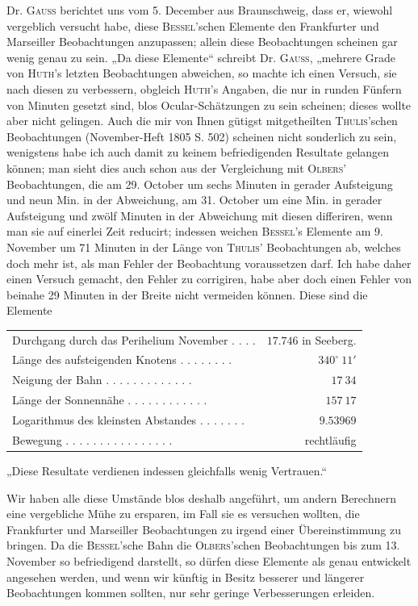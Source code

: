 Dr. \textsc{Gauss} berichtet uns vom 5. December aus Braunschweig, dass er, wiewohl vergeblich versucht habe, diese \textsc{Bessel}'schen Elemente den Frankfurter und Marseiller Beobachtungen anzupassen; allein diese Beobachtungen scheinen gar wenig genau zu sein. „Da diese Elemente“ schreibt Dr. \textsc{Gauss}, „mehrere Grade von \textsc{Huth}'s letzten Beobachtungen abweichen, so machte ich einen Versuch, sie nach diesen zu verbessern, obgleich \textsc{Huth}'s Angaben, die nur in runden Fünfern von Minuten gesetzt sind, blos Ocular-Schätzungen zu sein scheinen; dieses wollte aber nicht gelingen. Auch die mir von Ihnen gütigst mitgetheilten \textsc{Thulis}'schen Beobachtungen (November-Heft 1805 S. 502) scheinen nicht sonderlich zu sein, wenigstens habe ich auch damit zu keinem befriedigenden Resultate gelangen können; man sieht dies auch schon aus der Vergleichung mit \textsc{Olbers}' Beobachtungen, die am 29. October um sechs Minuten in gerader Aufsteigung und neun Min. in der Abweichung, am 31. October um eine Min. in gerader Aufsteigung und zwölf Minuten in der Abweichung mit diesen differiren, wenn man sie auf einerlei Zeit reducirt; indessen weichen \textsc{Bessel}'s Elemente am 9. November um 71 Minuten in der Länge von \textsc{Thulis}' Beobachtungen ab, welches doch mehr ist, als man Fehler der Beobachtung voraussetzen darf. Ich habe daher einen Versuch gemacht, den Fehler zu corrigiren, habe aber doch einen Fehler von beinahe 29 Minuten in der Breite nicht vermeiden können. Diese sind die Elemente

\begin{center}
\begingroup\fontsize{8}{10}\selectfont\setlength{\tabcolsep}{3pt}\renewcommand{\arraystretch}{1.1}
\begin{tabular}{lr}
Durchgang durch das Perihelium November . . . . & $17.746$ in Seeberg. \\
Länge des aufsteigenden Knotens . . . . . . . . & $340^\circ\ 11'$ \\
Neigung der Bahn . . . . . . . . . . . . . & $17\ 34$ \\
Länge der Sonnennähe . . . . . . . . . . . . & $157\ 17$ \\
Logarithmus des kleinsten Abstandes . . . . . . . & $9.53969$ \\
Bewegung . . . . . . . . . . . . . . . . & rechtläufig \\
\end{tabular}\endgroup
\end{center}

„Diese Resultate verdienen indessen gleichfalls wenig Vertrauen.“
\par\indent Wir haben alle diese Umstände blos deshalb angeführt, um andern Berechnern eine vergebliche Mühe zu ersparen, im Fall sie es versuchen wollten, die Frankfurter und Marseiller Beobachtungen zu irgend einer Übereinstimmung zu bringen. Da die \textsc{Bessel}'sche Bahn die \textsc{Olbers}'schen Beobachtungen bis zum 13. November so befriedigend darstellt, so dürfen diese Elemente als genau entwickelt angesehen werden, und wenn wir künftig in Besitz besserer und längerer Beobachtungen kommen sollten, nur sehr geringe Verbesserungen erleiden.

